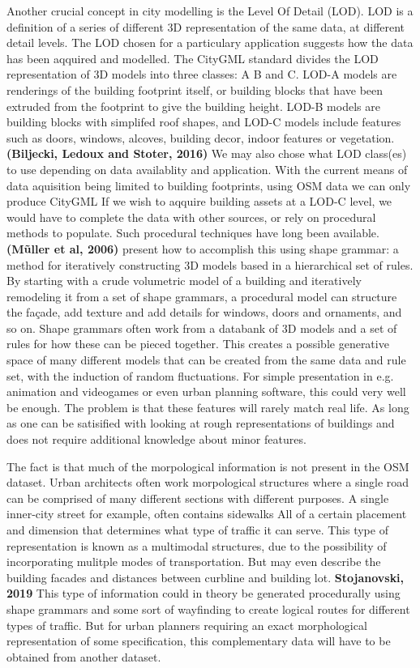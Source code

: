 \documentclass{kththesis}
\begin{document}
Another crucial concept in city modelling is the Level Of Detail (LOD). LOD is a definition of a series of different 3D representation of the same data, at different detail levels.
The LOD chosen for a particulary application suggests how the data has been aqquired and modelled.
The CityGML standard divides the LOD representation of 3D models into three classes: A B and C.
LOD-A models are renderings of the building footprint itself, or building blocks that have been extruded from the footprint to give the building height.
LOD-B models are building blocks with simplifed roof shapes, and LOD-C models include features such as doors, windows, alcoves, building decor, indoor features or vegetation.
\textbf{(Biljecki, Ledoux and Stoter, 2016)}
We may also chose what LOD class(es) to use depending on data availablity and application.
With the current means of data aquisition being limited to building footprints, using OSM data we can only produce CityGML 
If we wish to aqquire building assets at a LOD-C level, we would have to complete the data with other sources, or rely on procedural methods to populate.
Such procedural techniques have long been available.
\textbf{(Mũller et al, 2006)} present how to accomplish this using shape grammar: a method for iteratively constructing 3D models based in a hierarchical set of rules.
By starting with a crude volumetric model of a building and iteratively remodeling it from a set of shape grammars, a procedural model can structure the façade, add texture and add details for windows, doors and ornaments, and so on.
Shape grammars often work from a databank of 3D models and a set of rules for how these can be pieced together.
This creates a possible generative space of many different models that can be created from the same data and rule set, with the induction of random fluctuations.
For simple presentation in e.g. animation and videogames or even urban planning software, this could very well be enough.
The problem is that these features will rarely match real life.
As long as one can be satisified with looking at rough representations of buildings and does not require additional knowledge about minor features.

The fact is that much of the morpological information is not present in the OSM dataset.
Urban architects often work morpological structures where a single road can be comprised of many different sections with different purposes.
A single inner-city street for example, often contains sidewalks 
All of a certain placement and dimension that determines what type of traffic it can serve.
This type of representation is known as a multimodal structures, due to the possibility of incorporating mulitple modes of transportation.
But may even describe the building facades and distances between curbline and building lot.
\textbf{Stojanovski, 2019}
This type of information could in theory be generated procedurally using shape grammars and some sort of wayfinding to create logical routes for different types of traffic.
But for urban planners requiring an exact morphological representation of some specification, this complementary data will have to be obtained from another dataset.
\end{document}
